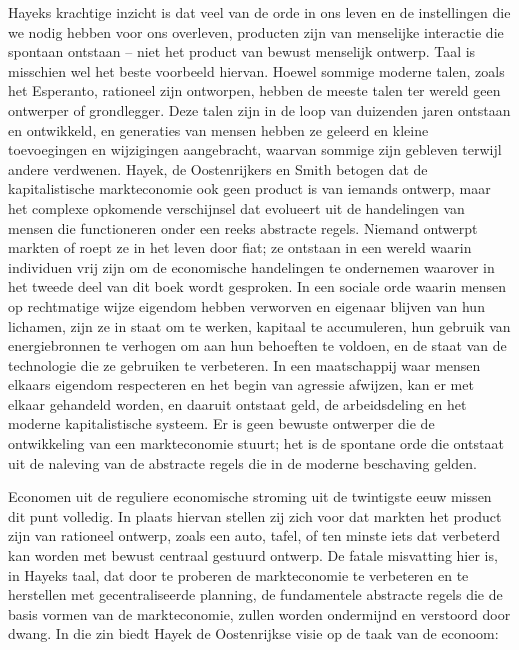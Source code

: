 Hayeks krachtige inzicht is dat veel van de orde in ons leven en de instellingen die we nodig hebben voor ons overleven, producten zijn van menselijke interactie die spontaan ontstaan -- niet het product van bewust menselijk ontwerp. Taal is misschien wel het beste voorbeeld hiervan. Hoewel sommige moderne talen, zoals het Esperanto, rationeel zijn ontworpen, hebben de meeste talen ter wereld geen ontwerper of grondlegger. Deze talen zijn in de loop van duizenden jaren ontstaan en ontwikkeld, en generaties van mensen hebben ze geleerd en kleine toevoegingen en wijzigingen aangebracht, waarvan sommige zijn gebleven terwijl andere verdwenen. Hayek, de Oostenrijkers en Smith betogen dat de kapitalistische markteconomie ook geen product is van iemands ontwerp, maar het complexe opkomende verschijnsel dat evolueert uit de handelingen van mensen die functioneren onder een reeks abstracte regels. Niemand ontwerpt markten of roept ze in het leven door fiat; ze ontstaan in een wereld waarin individuen vrij zijn om de economische handelingen te ondernemen waarover in het tweede deel van dit boek wordt gesproken. In een sociale orde waarin mensen op rechtmatige wijze eigendom hebben verworven en eigenaar blijven van hun lichamen, zijn ze in staat om te werken, kapitaal te accumuleren, hun gebruik van energiebronnen te verhogen om aan hun behoeften te voldoen, en de staat van de technologie die ze gebruiken te verbeteren. In een maatschappij waar mensen elkaars eigendom respecteren en het begin van agressie afwijzen, kan er met elkaar gehandeld worden, en daaruit ontstaat geld, de arbeidsdeling en het moderne kapitalistische systeem. Er is geen bewuste ontwerper die de ontwikkeling van een markteconomie stuurt; het is de spontane orde die ontstaat uit de naleving van de abstracte regels die in de moderne beschaving gelden.

Economen uit de reguliere economische stroming uit de twintigste eeuw missen dit punt volledig. In plaats hiervan stellen zij zich voor dat markten het product zijn van rationeel ontwerp, zoals een auto, tafel, of ten minste iets dat verbeterd kan worden met bewust centraal gestuurd ontwerp. De fatale misvatting hier is, in Hayeks taal, dat door te proberen de markteconomie te verbeteren en te herstellen met gecentraliseerde planning, de fundamentele abstracte regels die de basis vormen van de markteconomie, zullen worden ondermijnd en verstoord door dwang. In die zin biedt Hayek de Oostenrijkse visie op de taak van de econoom:

